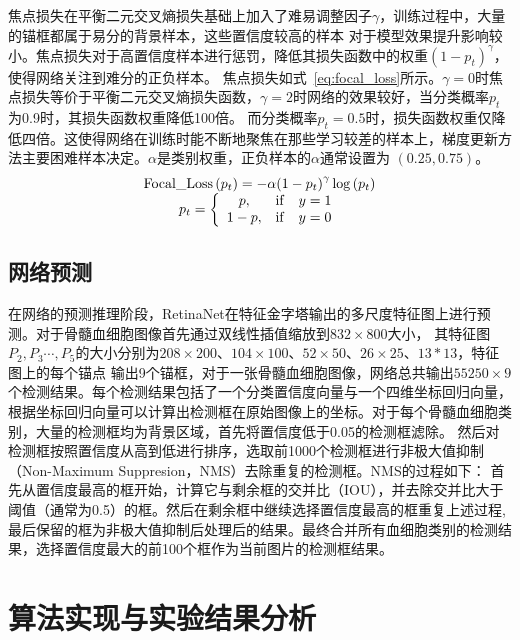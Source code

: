 焦点损失在平衡二元交叉熵损失基础上加入了难易调整因子$\gamma$，训练过程中，大量的锚框都属于易分的背景样本，这些置信度较高的样本
对于模型效果提升影响较小。焦点损失对于高置信度样本进行惩罚，降低其损失函数中的权重$(1-p_t)^{\gamma}$，使得网络关注到难分的正负样本。
焦点损失如式~\ref{eq:focal_loss}所示。$\gamma=0$时焦点损失等价于平衡二元交叉熵损失函数，$\gamma=2$时网络的效果较好，当分类概率$p_t$为0.9时，其损失函数权重降低100倍。
而分类概率$p_t = 0.5$时，损失函数权重仅降低四倍。这使得网络在训练时能不断地聚焦在那些学习较差的样本上，梯度更新方法主要困难样本决定。$\alpha$是类别权重，正负样本的$\alpha$通常设置为
$(0.25, 0.75)$。
\begin{equation}               
  \begin{array}{*{20}{c}} {{\rm{Focal\_Loss}}\left( {{p_t}} \right) =  - \alpha {{\left( {1 - {p_t}} \right)}^\gamma }\log \left( {{p_t}} \right)}\\ 
    {{p_t} = \left\{ {\begin{array}{*{20}{c}} {p,}&{{\rm{ if }}}&{y = 1}\\ {1 - p,}&{{\rm{ if }}}&{y = 0} \end{array}} \right.} \end{array}    
  \label{eq:focal_loss}     
\end{equation} 

\subsection{网络预测}

在网络的预测推理阶段，RetinaNet在特征金字塔输出的多尺度特征图上进行预测。对于骨髓血细胞图像首先通过双线性插值缩放到$832 \times 800$大小，
其特征图$P_2, P_3 \cdots, P_5$的大小分别为$208 \times 200$、$104 \times 100$、$52 \times 50$、$ 26 \times 25$、$13 * 13$，特征图上的每个锚点
输出9个锚框，对于一张骨髓血细胞图像，网络总共输出$55250 \times 9$个检测结果。每个检测结果包括了一个分类置信度向量与一个四维坐标回归向量，
根据坐标回归向量可以计算出检测框在原始图像上的坐标。对于每个骨髓血细胞类别，大量的检测框均为背景区域，首先将置信度低于0.05的检测框滤除。
然后对检测框按照置信度从高到低进行排序，选取前1000个检测框进行非极大值抑制（Non-Maximum Suppresion，NMS）去除重复的检测框。NMS的过程如下：
首先从置信度最高的框开始，计算它与剩余框的交并比（IOU），并去除交并比大于阈值（通常为0.5）的框。然后在剩余框中继续选择置信度最高的框重复上述过程,
最后保留的框为非极大值抑制后处理后的结果。最终合并所有血细胞类别的检测结果，选择置信度最大的前100个框作为当前图片的检测框结果。


\section{算法实现与实验结果分析}

